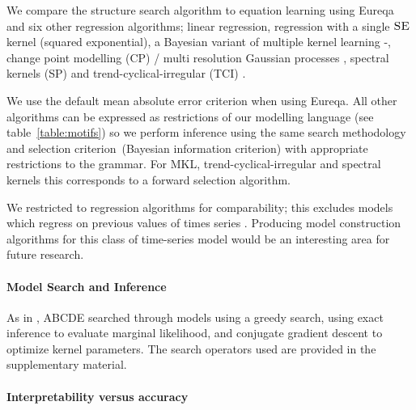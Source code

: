 \documentclass[letterpaper]{article}
\newcommand{\procedurename}{ABCDE}
\begin{document}
We compare the structure search algorithm to equation learning using Eureqa \citep{Eureqa} and six other regression algorithms; linear regression, \gp{} regression with a single ${\textsc{SE}}$ kernel (squared exponential), a Bayesian variant of multiple kernel learning \citep[e.g.][]{bach2004multiple}-, change point modelling (CP) / multi resolution Gaussian processes \citep[e.g.][]{garnett2010sequential, FoxDunson:NIPS2012}, spectral kernels (SP) \citep{WilAda13} and trend-cyclical-irregular (TCI) \citep[e.g.][]{lind2006basic}.

We use the default mean absolute error criterion when using Eureqa.
All other algorithms can be expressed as restrictions of our modelling language (see table~\ref{table:motifs}) so we perform inference using the same search methodology and selection criterion\footnotemark~(Bayesian information criterion) with appropriate restrictions to the grammar.
For MKL, trend-cyclical-irregular and spectral kernels this corresponds to a forward selection algorithm.

We restricted to regression algorithms for comparability; this excludes models which regress on previous values of times series \citep[e.g.][]{box2013time}.
Producing model construction algorithms for this class of time-series model would be an interesting area for future research.

\paragraph{Model Search and Inference}

As in \citep{DuvLloGroetal13}, \procedurename{} searched through models using a greedy search, using exact \gp{} inference to evaluate marginal likelihood, and conjugate gradient descent to optimize kernel parameters.
The search operators used are provided in the supplementary material.

\paragraph{Interpretability versus accuracy}
\end{document}
